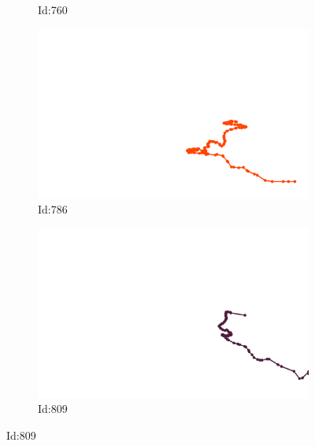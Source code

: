 \documentclass[12pt,twoside]{report}
\begin{document}
\begin{figure}
\begin{subfigure}[b]{0.20\textwidth}
\caption{Id:760}
\end{subfigure}
\begin{subfigure}[b]{0.20\textwidth}
\centering
\includegraphics[width=\textwidth]{../trajectories/786.png}
\caption{Id:786}
\end{subfigure}
\begin{subfigure}[b]{0.20\textwidth}
\centering
\includegraphics[width=\textwidth]{../trajectories/809.png}
\caption{Id:809}
\end{subfigure}
\end{figure}
\end{document}
